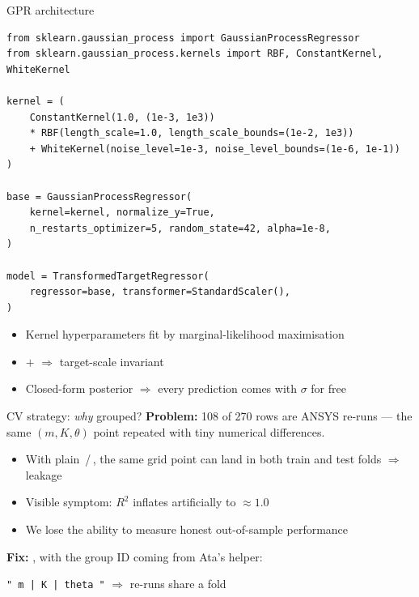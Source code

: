 \begin{frame}[fragile]{GPR architecture}
\begin{lstlisting}
from sklearn.gaussian_process import GaussianProcessRegressor
from sklearn.gaussian_process.kernels import RBF, ConstantKernel, WhiteKernel

kernel = (
    ConstantKernel(1.0, (1e-3, 1e3))
    * RBF(length_scale=1.0, length_scale_bounds=(1e-2, 1e3))
    + WhiteKernel(noise_level=1e-3, noise_level_bounds=(1e-6, 1e-1))
)

base = GaussianProcessRegressor(
    kernel=kernel, normalize_y=True,
    n_restarts_optimizer=5, random_state=42, alpha=1e-8,
)

model = TransformedTargetRegressor(
    regressor=base, transformer=StandardScaler(),
)
\end{lstlisting}

  \begin{itemize}\small
    \item Kernel hyperparameters fit by marginal-likelihood maximisation
    \item {} \(+\)  \(\Rightarrow\) target-scale invariant
    \item Closed-form posterior \(\Rightarrow\) every prediction comes with \(\sigma\) for free
  \end{itemize}
\end{frame}

\begin{frame}{CV strategy: \textit{why} grouped?}
  \textbf{Problem:} 108 of 270 rows are ANSYS re-runs --- the same
  \((m, K, \theta)\) point repeated with tiny numerical differences.

  \vspace{0.3cm}
  \begin{itemize}
    \item With plain \,/\,, the same grid point can
          land in both train and test folds \(\Rightarrow\) \alert{leakage}
    \item Visible symptom: \(R^2\) inflates artificially to \(\approx 1.0\)
    \item We lose the ability to measure honest out-of-sample performance
  \end{itemize}

  \vspace{0.4cm}
  \textbf{Fix:} , with the group ID coming
  from Ata's  helper:
  \begin{center}
    \texttt{"\,m\,|\,K\,|\,theta\,"} \quad \(\Rightarrow\) \quad re-runs share a fold
  \end{center}
\end{frame}

